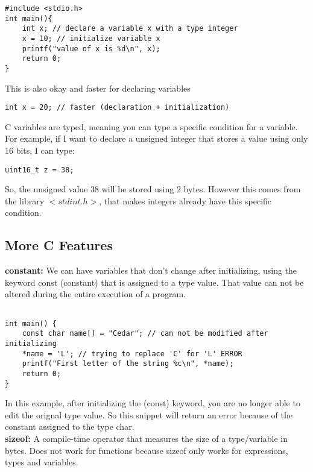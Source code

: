 \documentclass{article}
\begin{document}
\begin{verbatim}
#include <stdio.h>
int main(){
	int x; // declare a variable x with a type integer 
	x = 10; // initialize variable x
	printf("value of x is %d\n", x);
	return 0;
}
\end{verbatim}

\noindent This is also okay and faster for declaring variables 

\begin{verbatim}
int x = 20; // faster (declaration + initialization)
\end{verbatim} 

\noindent C variables are typed, meaning you can type a specific condition for a variable. For example, if I want to declare a unsigned integer that stores a
value using only 16 bits, I can type: 

\begin{verbatim}
uint16_t z = 38;
\end{verbatim}

So, the unsigned value 38 will be stored using 2 bytes. However this comes from the library $<stdint.h>$, that makes integers already have this specific
condition.

\subsection*{More C Features}
\textbf{constant:} We can have variables that don't change after initializing, using the keyword const (constant) that is assigned to a type value. 
That value can not be altered during the entire execution of a program. \\

\begin{verbatim}

int main() {
	const char name[] = "Cedar"; // can not be modified after initializing 
	*name = 'L'; // trying to replace 'C' for 'L' ERROR
	printf("First letter of the string %c\n", *name);
	return 0;
}

\end{verbatim}

In this example, after initializing the (const) keyword, you are no longer able to edit the orignal type value. So this snippet will return an error
because of the constant assigned to the type char. \\

\noindent \textbf{sizeof:} A compile-time operator that measures the size of a type/variable in bytes. Does not work for functions because sizeof only 
works for expressions, types and variables.
\end{document}

